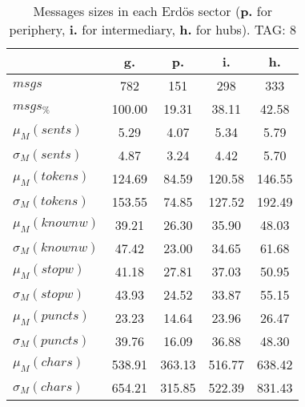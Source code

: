\begin{table}[h!]
\begin{center}
\begin{tabular}{| l | c | c | c | c |}\hline
 & g. & p. & i. & h. \\\hline
$msgs$ & 782  & 151  & 298  & 333 \\\hline
$msgs_{\%}$ & 100.00  & 19.31  & 38.11  & 42.58 \\\hline
$\mu_M(sents)$ & 5.29  & 4.07  & 5.34  & 5.79 \\\hline
$\sigma_M(sents)$ & 4.87  & 3.24  & 4.42  & 5.70 \\\hline
$\mu_M(tokens)$ & 124.69  & 84.59  & 120.58  & 146.55 \\\hline
$\sigma_M(tokens)$ & 153.55  & 74.85  & 127.52  & 192.49 \\\hline
$\mu_M(knownw)$ & 39.21  & 26.30  & 35.90  & 48.03 \\\hline
$\sigma_M(knownw)$ & 47.42  & 23.00  & 34.65  & 61.68 \\\hline
$\mu_M(stopw)$ & 41.18  & 27.81  & 37.03  & 50.95 \\\hline
$\sigma_M(stopw)$ & 43.93  & 24.52  & 33.87  & 55.15 \\\hline
$\mu_M(puncts)$ & 23.23  & 14.64  & 23.96  & 26.47 \\\hline
$\sigma_M(puncts)$ & 39.76  & 16.09  & 36.88  & 48.30 \\\hline
$\mu_M(chars)$ & 538.91  & 363.13  & 516.77  & 638.42 \\\hline
$\sigma_M(chars)$ & 654.21  & 315.85  & 522.39  & 831.43 \\\hline
\end{tabular}
\caption{Messages sizes in each Erd\"os sector ({{\bf p.}} for periphery, {{\bf i.}} for intermediary, {{\bf h.}} for hubs). TAG: 8}
\end{center}
\end{table}